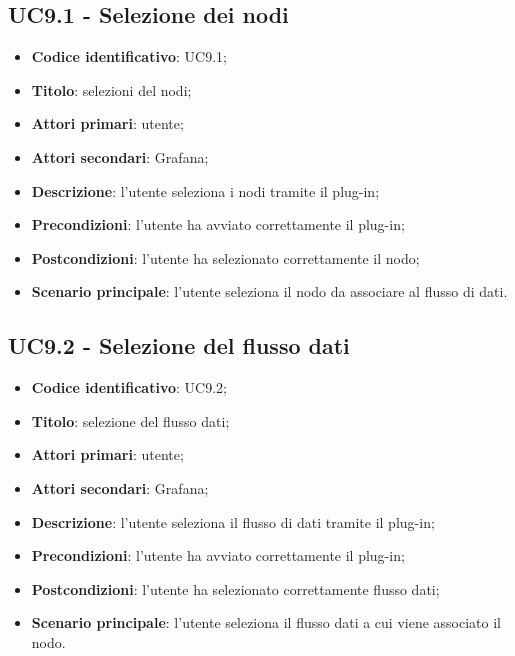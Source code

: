 \subsection{UC9.1 - Selezione dei nodi}
\begin{itemize}
	\item \textbf{Codice identificativo}: UC9.1;
	\item \textbf{Titolo}: selezioni del nodi;
	\item \textbf{Attori primari}: utente;
	\item \textbf{Attori secondari}: Grafana\glo;
	\item \textbf{Descrizione}: l'utente seleziona i nodi tramite il plug-in;
	\item \textbf{Precondizioni}: l'utente ha avviato correttamente il plug-in;
	\item \textbf{Postcondizioni}: l'utente ha selezionato correttamente il nodo;
	\item \textbf{Scenario principale}: l'utente seleziona il nodo da associare al flusso di dati.
\end{itemize}

\subsection{UC9.2 - Selezione del flusso dati}
\begin{itemize}
	\item \textbf{Codice identificativo}: UC9.2;
	\item \textbf{Titolo}: selezione del flusso dati;
	\item \textbf{Attori primari}: utente;
	\item \textbf{Attori secondari}: Grafana\glo;
	\item \textbf{Descrizione}: l'utente seleziona il flusso di dati tramite il plug-in;
	\item \textbf{Precondizioni}: l'utente ha avviato correttamente il plug-in;
	\item \textbf{Postcondizioni}: l'utente ha selezionato correttamente flusso dati;
	\item \textbf{Scenario principale}: l'utente seleziona il flusso dati a cui viene associato il nodo.
\end{itemize}

